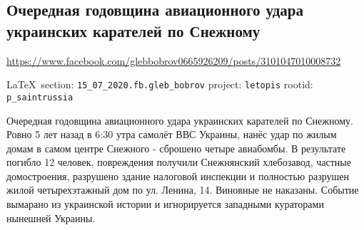  
 
\subsection{Очередная годовщина авиационного удара украинских карателей по Снежному}
\url{https://www.facebook.com/glebbobrov0665926209/posts/3101047010008732}
  
\vspace{0.5cm}
{\small\LaTeX~section: \verb|15_07_2020.fb.gleb_bobrov| project: \verb|letopis| rootid: \verb|p_saintrussia|}
\vspace{0.5cm}

Очередная годовщина авиационного удара украинских карателей по Снежному. Ровно
5 лет назад в 6:30 утра самолёт ВВС Украины, нанёс удар по жилым домам в самом
центре Снежного - сброшено четыре авиабомбы. В результате погибло 12 человек,
повреждения получили Снежнянский хлебозавод, частные домостроения, разрушено
здание налоговой инспекции и полностью разрушен жилой четырехэтажный дом по ул.
Ленина, 14. Виновные не наказаны. Событие вымарано из украинской истории и
игнорируется западными кураторами нынешней Украины.
  
